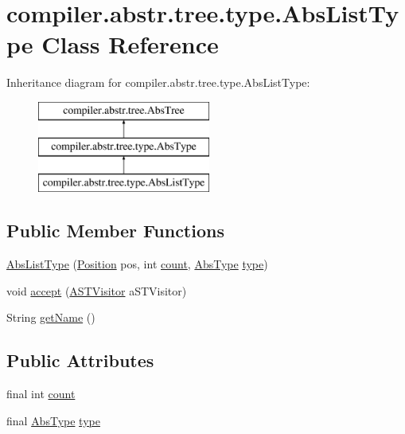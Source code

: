 \hypertarget{classcompiler_1_1abstr_1_1tree_1_1type_1_1_abs_list_type}{}\section{compiler.\+abstr.\+tree.\+type.\+Abs\+List\+Type Class Reference}
\label{classcompiler_1_1abstr_1_1tree_1_1type_1_1_abs_list_type}
Inheritance diagram for compiler.\+abstr.\+tree.\+type.\+Abs\+List\+Type\+:\begin{figure}[H]
\begin{center}
\leavevmode
\includegraphics[height=3.000000cm]{classcompiler_1_1abstr_1_1tree_1_1type_1_1_abs_list_type}
\end{center}
\end{figure}
\subsection*{Public Member Functions}
\begin{DoxyCompactItemize}
\item 
\hyperlink{classcompiler_1_1abstr_1_1tree_1_1type_1_1_abs_list_type_af1c23156f700626a3fb420314af783e9}{Abs\+List\+Type} (\hyperlink{classcompiler_1_1_position}{Position} pos, int \hyperlink{classcompiler_1_1abstr_1_1tree_1_1type_1_1_abs_list_type_a1346e667a1b7ff42c54a84e3da7561e4}{count}, \hyperlink{classcompiler_1_1abstr_1_1tree_1_1type_1_1_abs_type}{Abs\+Type} \hyperlink{classcompiler_1_1abstr_1_1tree_1_1type_1_1_abs_list_type_a3f74cdbd0bac2acaa8f3fbb41020ece2}{type})
\item 
void \hyperlink{classcompiler_1_1abstr_1_1tree_1_1type_1_1_abs_list_type_a81a7381479875ce386803ddfb06e117c}{accept} (\hyperlink{interfacecompiler_1_1abstr_1_1_a_s_t_visitor}{A\+S\+T\+Visitor} a\+S\+T\+Visitor)
\item 
String \hyperlink{classcompiler_1_1abstr_1_1tree_1_1type_1_1_abs_list_type_a52a5c71d4bf713cc81a5ccb0cd9a5e9d}{get\+Name} ()
\end{DoxyCompactItemize}
\subsection*{Public Attributes}
\begin{DoxyCompactItemize}
\item 
final int \hyperlink{classcompiler_1_1abstr_1_1tree_1_1type_1_1_abs_list_type_a1346e667a1b7ff42c54a84e3da7561e4}{count}
\item 
final \hyperlink{classcompiler_1_1abstr_1_1tree_1_1type_1_1_abs_type}{Abs\+Type} \hyperlink{classcompiler_1_1abstr_1_1tree_1_1type_1_1_abs_list_type_a3f74cdbd0bac2acaa8f3fbb41020ece2}{type}
\end{DoxyCompactItemize}


